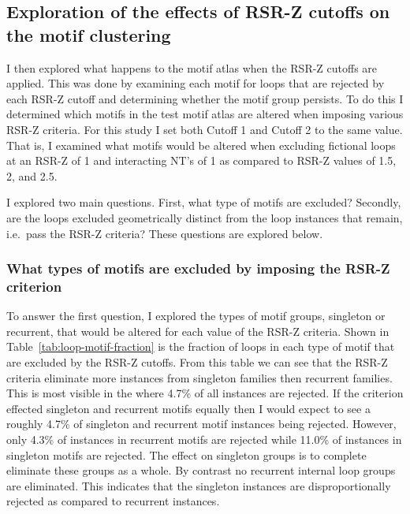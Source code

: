 \subsection{Exploration of the effects of RSR-Z cutoffs on the motif clustering}

I then explored what happens to the motif atlas when the RSR-Z cutoffs are
applied. This was done by examining each motif for loops that are rejected by
each RSR-Z cutoff and determining whether the motif group persists. To do this I
determined which motifs in the test motif atlas are altered when imposing
various RSR-Z criteria. For this study I set both Cutoff 1 and Cutoff 2 to the
same value. That is, I examined what motifs would be altered when excluding
fictional loops at an RSR-Z of 1 and interacting NT's of
1 as compared to RSR-Z values of 1.5, 2, and 2.5.

I explored two main questions. First, what type of motifs are excluded?
Secondly, are the loops excluded geometrically distinct from the loop instances
that remain, i.e.\ pass the RSR-Z criteria? These questions are explored below.

\subsubsection{What types of motifs are excluded by imposing the RSR-Z criterion}

To answer the first question, I explored the types of motif groups, singleton or
recurrent, that would be altered for each value of the RSR-Z criteria. Shown in
Table~\ref{tab:loop-motif-fraction} is the fraction of loops in each type of
motif that are excluded by the RSR-Z cutoffs. From this table we can see that
the RSR-Z criteria eliminate more instances from singleton families then
recurrent families. This is most visible in the  where 4.7\% of all
instances are rejected. If the criterion effected singleton and recurrent motifs
equally then I would expect to see a roughly 4.7\% of singleton and recurrent
motif instances being rejected. However, only 4.3\% of instances in recurrent
motifs are rejected while 11.0\% of instances in singleton motifs are rejected.
The effect on singleton groups is to complete eliminate these groups as a whole.
By contrast no recurrent internal loop groups are eliminated. This indicates
that the singleton instances are disproportionally rejected as compared to
recurrent instances.

